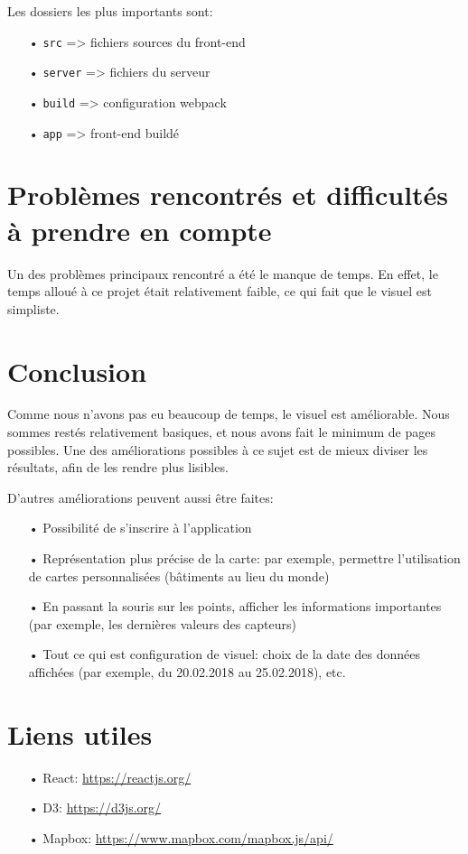 Les dossiers les plus importants sont:

\begin{itemize}
\item[•] \texttt{src} => fichiers sources du front-end
\item[•] \texttt{server} => fichiers du serveur
\item[•] \texttt{build} => configuration webpack
\item[•] \texttt{app} => front-end buildé
\end{itemize}

\section{Problèmes rencontrés et difficultés à prendre en compte}

Un des problèmes principaux rencontré a été le manque de temps. En effet, le temps alloué à ce projet était relativement faible, ce qui fait que le visuel est simpliste.

\section{Conclusion}

Comme nous n'avons pas eu beaucoup de temps, le visuel est améliorable. Nous sommes restés relativement basiques, et nous avons fait le minimum de pages possibles. Une des améliorations possibles à ce sujet est de mieux diviser les résultats, afin de les rendre plus lisibles.

D'autres améliorations peuvent aussi être faites:

\begin{itemize}
\item[•] Possibilité de s'inscrire à l'application
\item[•] Représentation plus précise de la carte: par exemple, permettre l'utilisation de cartes personnalisées (bâtiments au lieu du monde)
\item[•] En passant la souris sur les points, afficher les informations importantes (par exemple, les dernières valeurs des capteurs)
\item[•] Tout ce qui est configuration de visuel: choix de la date des données affichées (par exemple, du 20.02.2018 au 25.02.2018), etc.
\end{itemize}    
    
\section{Liens utiles}

\begin{itemize}
\item[•] React: \url{https://reactjs.org/}
\item[•] D3: \url{https://d3js.org/}
\item[•] Mapbox: \url{https://www.mapbox.com/mapbox.js/api/}
\end{itemize}

